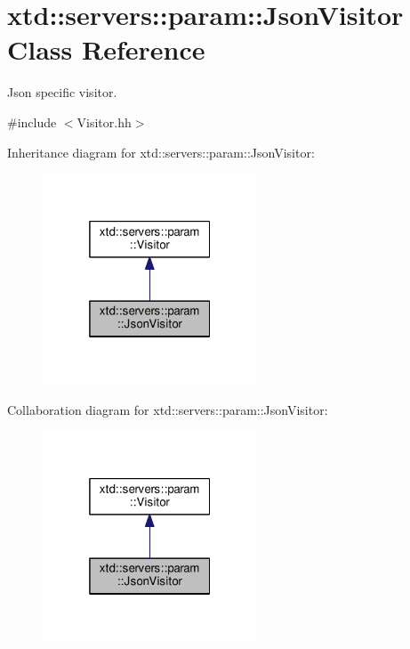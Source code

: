 \hypertarget{classxtd_1_1servers_1_1param_1_1JsonVisitor}{}\section{xtd\+:\+:servers\+:\+:param\+:\+:Json\+Visitor Class Reference}
\label{classxtd_1_1servers_1_1param_1_1JsonVisitor}


Json specific visitor.  




{\ttfamily \#include $<$Visitor.\+hh$>$}



Inheritance diagram for xtd\+:\+:servers\+:\+:param\+:\+:Json\+Visitor\+:
\nopagebreak
\begin{figure}[H]
\begin{center}
\leavevmode
\includegraphics[width=181pt]{classxtd_1_1servers_1_1param_1_1JsonVisitor__inherit__graph}
\end{center}
\end{figure}


Collaboration diagram for xtd\+:\+:servers\+:\+:param\+:\+:Json\+Visitor\+:
\nopagebreak
\begin{figure}[H]
\begin{center}
\leavevmode
\includegraphics[width=181pt]{classxtd_1_1servers_1_1param_1_1JsonVisitor__coll__graph}
\end{center}
\end{figure}
